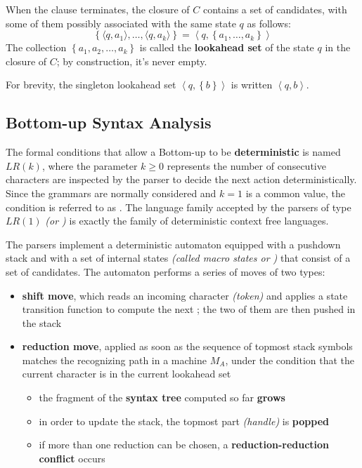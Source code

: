 \documentclass[english]{article}
\begin{document}
When the clause terminates, the closure of \(C\) contains a set of candidates, with some of them possibly associated with the same state \(q\) as follows:
\[ \left\{ \langle q, a_1 \rangle, \ldots, \langle q, a_k \rangle \right\} = \left\langle q, \left\{ a_1, \ldots, a_k \right\} \right\rangle \]
The collection \(\left\{ a_1, a_2, \ldots, a_k \right\}\) is called the \textbf{lookahead set} of the state \(q\) in the closure of \(C\);
by construction, it's never empty.

For brevity, the singleton lookahead set \(\left\langle q, \left\{ b \right\} \right\rangle\) is written \(\left\langle q, b \right\rangle\).

\subsection{Bottom-up Syntax Analysis}

The formal conditions that allow a Bottom-up to be \textbf{deterministic} is named \(\textit{LR}(k)\), where the parameter \(k \geq 0\) represents the number of consecutive characters are inspected by the parser to decide the next action deterministically.
Since the \EBNF grammars are normally considered and \(k=1\) is a common value, the condition is referred to as \elro.
The language family accepted by the parsers of type \(\textit{LR}(1)\) \textit{(or \elro)} is exactly the family \DET of deterministic context free languages.

The \elro parsers implement a deterministic automaton equipped with a pushdown stack and with a set of internal states \textit{(called macro states or \mstates)} that consist of a set of candidates.
The automaton performs a series of moves of two types:

\begin{itemize}
  \item \textbf{shift move}, which reads an incoming character \textit{(token)} and applies a state transition function to compute the next \mstate; the two of them are then pushed in the stack
  \item \textbf{reduction move}, applied as soon as the sequence of topmost stack symbols matches the recognizing path in a machine \(M_A\), under the condition that the current character is in the current lookahead set
        \begin{itemize}[label=\(\rightarrow\)]
          \item the fragment of the \textbf{syntax tree} computed so far \textbf{grows}
          \item in order to update the stack, the topmost part \textit{(handle)} is \textbf{popped}
          \item if more than one reduction can be chosen, a \textbf{reduction-reduction conflict} occurs
        \end{itemize}
\end{itemize}
\end{document}
